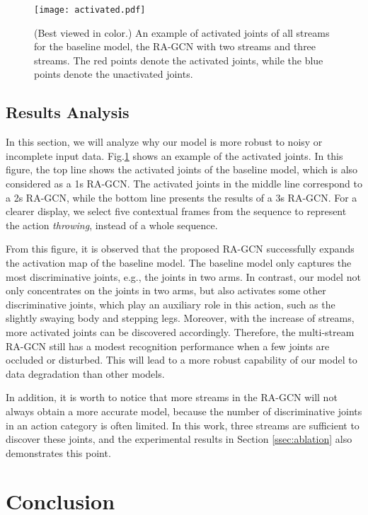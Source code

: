 \documentclass[journal]{IEEEtran}
\begin{document}
\begin{figure}[t]
    \centering
    \texttt{[image: activated.pdf]}
    \caption{(Best viewed in color.) An example of activated joints of all streams for the baseline model, the RA-GCN with two streams and three streams. The {\color{red}red} points denote the activated joints, while the {\color{blue}blue} points denote the unactivated joints.}
    \label{fig:activated}
\end{figure}

\subsection{Results Analysis}
\label{ssec:analysis}

In this section, we will analyze why our model is more robust to noisy or incomplete input data. Fig.\ref{fig:activated} shows an example of the activated joints. In this figure, the top line shows the activated joints of the baseline model, which is also considered as a 1s RA-GCN. The activated joints in the middle line correspond to a 2s RA-GCN, while the bottom line presents the results of a 3s RA-GCN. For a clearer display, we select five contextual frames from the sequence to represent the action {\it throwing}, instead of a whole sequence.

From this figure, it is observed that the proposed RA-GCN successfully expands the activation map of the baseline model. The baseline model only captures the most discriminative joints, e.g., the joints in two arms. In contrast, our model not only concentrates on the joints in two arms, but also activates some other discriminative joints, which play an auxiliary role in this action, such as the slightly swaying body and stepping legs. Moreover, with the increase of streams, more activated joints can be discovered accordingly. Therefore, the multi-stream RA-GCN still has a modest recognition performance when a few joints are occluded or disturbed. This will lead to a more robust capability of our model to data degradation than other models.

In addition, it is worth to notice that more streams in the RA-GCN will not always obtain a more accurate model, because the number of discriminative joints in an action category is often limited. In this work, three streams are sufficient to discover these joints, and the experimental results in Section \ref{ssec:ablation} also demonstrates this point.


\section{Conclusion}
\label{sec:conclusion}
\end{document}
